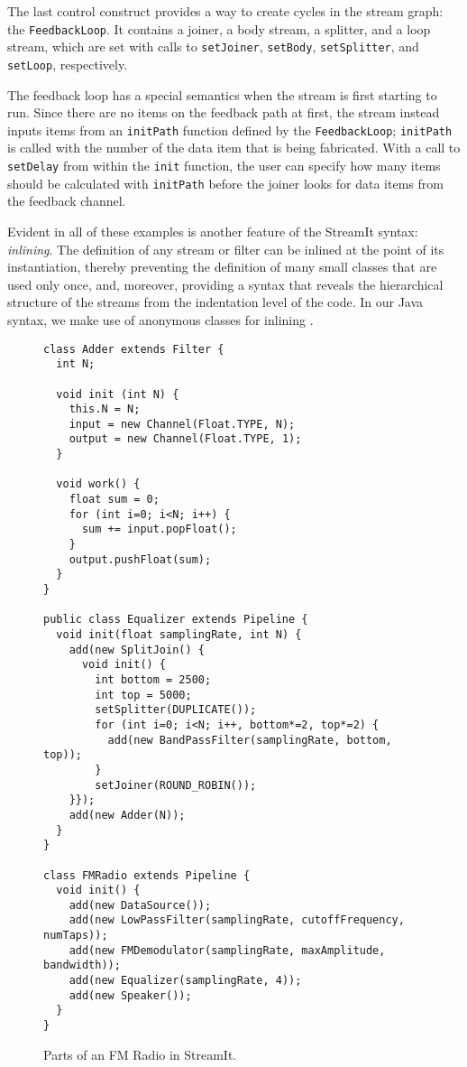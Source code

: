 The last control construct provides a way to create cycles in the
stream graph: the {\tt FeedbackLoop}.  It contains a joiner, a body
stream, a splitter, and a loop stream, which are set with calls to
{\tt setJoiner}, {\tt setBody}, {\tt setSplitter}, and {\tt setLoop},
respectively.

The feedback loop has a special semantics when the stream is first
starting to run.  Since there are no items on the feedback path at
first, the stream instead inputs items from an {\tt initPath} function
defined by the {\tt FeedbackLoop}; {\tt initPath} is called with the
number of the data item that is being fabricated.  With a call to {\tt
setDelay} from within the {\tt init} function, the user can specify
how many items should be calculated with {\tt initPath} before the
joiner looks for data items from the feedback channel.

Evident in all of these examples is another feature of the StreamIt
syntax: {\it inlining}.  The definition of any stream or filter can be
inlined at the point of its instantiation, thereby preventing the
definition of many small classes that are used only once, and,
moreover, providing a syntax that reveals the hierarchical structure
of the streams from the indentation level of the code.  In our Java
syntax, we make use of anonymous classes for inlining \cite{java}.

\begin{figure}
\scriptsize
\begin{verbatim}
class Adder extends Filter {
  int N;

  void init (int N) {
    this.N = N;
    input = new Channel(Float.TYPE, N);
    output = new Channel(Float.TYPE, 1);
  }
  
  void work() {
    float sum = 0;
    for (int i=0; i<N; i++) {
      sum += input.popFloat();
    }
    output.pushFloat(sum);
  }
}

public class Equalizer extends Pipeline {
  void init(float samplingRate, int N) {
    add(new SplitJoin() {
      void init() {
        int bottom = 2500;
        int top = 5000;
        setSplitter(DUPLICATE());
        for (int i=0; i<N; i++, bottom*=2, top*=2) {
          add(new BandPassFilter(samplingRate, bottom, top));
        }
        setJoiner(ROUND_ROBIN());
    }});
    add(new Adder(N));
  }
}
  
class FMRadio extends Pipeline {
  void init() {
    add(new DataSource());
    add(new LowPassFilter(samplingRate, cutoffFrequency, numTaps));
    add(new FMDemodulator(samplingRate, maxAmplitude, bandwidth));
    add(new Equalizer(samplingRate, 4));
    add(new Speaker());
  }
}
\end{verbatim}
\vspace{-12pt}
\caption{Parts of an FM Radio in StreamIt.
\protect\label{fig:radiocode}}
\vspace{-12pt}
\end{figure}

